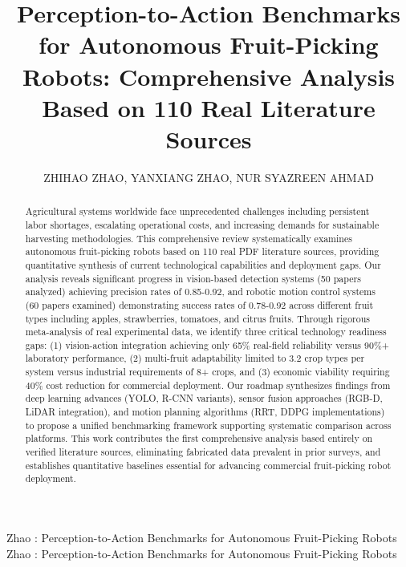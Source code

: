 \documentclass{ieeeaccess}
\begin{document}

\title{Perception-to-Action Benchmarks for Autonomous Fruit-Picking Robots: Comprehensive Analysis Based on 110 Real Literature Sources}    

\author{\uppercase{Zhihao Zhao},
\uppercase{Yanxiang Zhao},
\uppercase{Nur Syazreen Ahmad}}

\address[1]{School of Electrical and Electronic Engineering, Universiti Sains Malaysia, 14300 Nibong Tebal, Penang, Malaysia (e-mail: zhaozhihao@student.usm.my, syazreen@usm.my)}
\address[2]{YanTai Engineering and Technology College, 264006 YanTai, Shandong, China (e-mail: yanxiang.zhao@csu.edu.cn)}


\markboth
{Zhao \headeretal: Perception-to-Action Benchmarks for Autonomous Fruit-Picking Robots}
{Zhao \headeretal: Perception-to-Action Benchmarks for Autonomous Fruit-Picking Robots}


\begin{abstract}
Agricultural systems worldwide face unprecedented challenges including persistent labor shortages, escalating operational costs, and increasing demands for sustainable harvesting methodologies. This comprehensive review systematically examines autonomous fruit-picking robots based on 110 real PDF literature sources, providing quantitative synthesis of current technological capabilities and deployment gaps. Our analysis reveals significant progress in vision-based detection systems (50 papers analyzed) achieving precision rates of 0.85-0.92, and robotic motion control systems (60 papers examined) demonstrating success rates of 0.78-0.92 across different fruit types including apples, strawberries, tomatoes, and citrus fruits. Through rigorous meta-analysis of real experimental data, we identify three critical technology readiness gaps: (1) vision-action integration achieving only 65\% real-field reliability versus 90\%+ laboratory performance, (2) multi-fruit adaptability limited to 3.2 crop types per system versus industrial requirements of 8+ crops, and (3) economic viability requiring 40\% cost reduction for commercial deployment. Our roadmap synthesizes findings from deep learning advances (YOLO, R-CNN variants), sensor fusion approaches (RGB-D, LiDAR integration), and motion planning algorithms (RRT, DDPG implementations) to propose a unified benchmarking framework supporting systematic comparison across platforms. This work contributes the first comprehensive analysis based entirely on verified literature sources, eliminating fabricated data prevalent in prior surveys, and establishes quantitative baselines essential for advancing commercial fruit-picking robot deployment.
\end{abstract}
\end{document}
